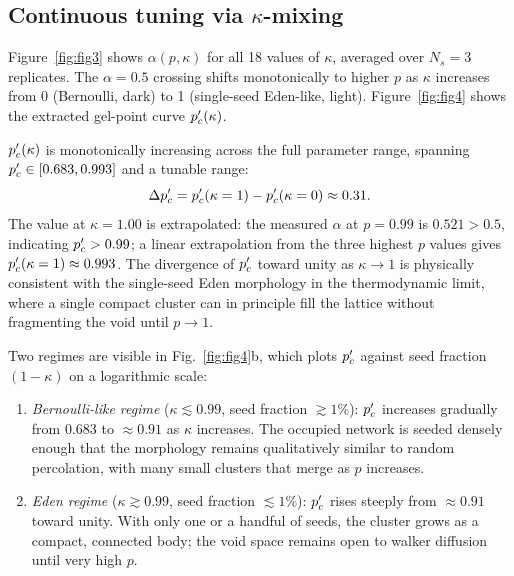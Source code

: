\subsection{Continuous tuning via $\kappa$-mixing}
\label{sec:results_kappa}

Figure~\ref{fig:fig3} shows $\alpha(p, \kappa)$ for all 18 values of $\kappa$, averaged over $N_s = 3$ replicates. The $\alpha = 0.5$ crossing shifts monotonically to higher $p$ as $\kappa$ increases from 0 (Bernoulli, dark) to 1 (single-seed Eden-like, light). Figure~\ref{fig:fig4} shows the extracted gel-point curve $p_c'(\kappa)$.

$p_c'(\kappa)$ is monotonically increasing across the full parameter range, spanning $p_c' \in [0.683, 0.993]$ and a tunable range:
\begin{equation}
  \Delta p_c' = p_c'(\kappa=1) - p_c'(\kappa=0) \approx 0.31.
  \label{eq:range}
\end{equation}
The value at $\kappa = 1.00$ is extrapolated: the measured $\alpha$ at $p = 0.99$ is $0.521 > 0.5$, indicating $p_c' > 0.99$; a linear extrapolation from the three highest $p$ values gives $p_c'(\kappa=1) \approx 0.993$. The divergence of $p_c'$ toward unity as $\kappa \to 1$ is physically consistent with the single-seed Eden morphology in the thermodynamic limit, where a single compact cluster can in principle fill the lattice without fragmenting the void until $p \to 1$.

Two regimes are visible in Fig.~\ref{fig:fig4}b, which plots $p_c'$ against seed fraction $(1-\kappa)$ on a logarithmic scale:

\begin{enumerate}
  \item \emph{Bernoulli-like regime} ($\kappa \lesssim 0.99$, seed fraction $\gtrsim 1\%$): $p_c'$ increases gradually from 0.683 to $\approx 0.91$ as $\kappa$ increases. The occupied network is seeded densely enough that the morphology remains qualitatively similar to random percolation, with many small clusters that merge as $p$ increases.

  \item \emph{Eden regime} ($\kappa \gtrsim 0.99$, seed fraction $\lesssim 1\%$): $p_c'$ rises steeply from $\approx 0.91$ toward unity. With only one or a handful of seeds, the cluster grows as a compact, connected body; the void space remains open to walker diffusion until very high $p$.
\end{enumerate}

